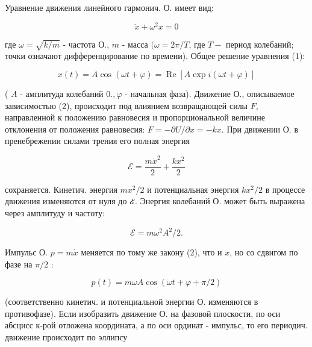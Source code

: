 \documentclass[10pt]{article}
\begin{document}
Уравнение движения линейного гармонич. О. имеет вид:



\[

\ddot{x}+\omega^{2} x=0

\]



где $\omega=\sqrt{k / m}$ - частота О., $m$ - масса $(\omega=2 \pi / T$, где $T-$ период колебаний; точки означают дифференцирование по времени). Общее решение уравнения (1):



\[

x(t)=A \cos (\omega t+\varphi)=\operatorname{Re}[A \exp i(\omega t+\varphi)]

\]



( $A$ - амплитуда колебаний $0 ., \varphi$ - начальная фаза). Движение О., описываемое зависимостью (2), происходит под влиянием возвращающей силы $F$, направленной к положению равновесия и пропорциональной величине отклонения от положения равновесия: $F=-\partial U / \partial x=-k x$. При движении О. в пренебрежении силами трения его полная энергия



\[

\mathscr{E}=\frac{m \dot{x}^{2}}{2}+\frac{k x^{2}}{2}

\]



сохраняется. Кинетич. энергия $m x^{2} / 2$ и потенциальная энергия $k x^{2} / 2$ в процессе движения изменяются от нуля до ๕. Энергия колебаний О. может быть выражена через амплитуду и частоту:



\[

\mathscr{E}=m \omega^{2} A^{2} / 2 .

\]



Импульс О. $p=m \dot{x}$ меняется по тому же закону (2), что и $x$, но со сдвигом по фазе на $\pi / 2$ :



\[

p(t)=m \omega A \cos (\omega t+\varphi+\pi / 2)

\]



(соответственно кинетич. и потенциальной энергии О. изменяются в противофазе). Если изобразить движение О. на фазовой плоскости, по оси абсцисс к-рой отложена координата, а по оси ординат - импульс, то его периодич. движение происходит по эллипсу
\end{document}
